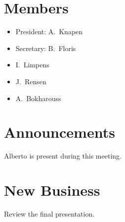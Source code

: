 \section{Members}
\begin{itemize}
	\item President: A.~Knapen
    \item Secretary: B.~Floris
    \item I.~Limpens
	\item J.~Rensen
    \item A.~Bokharouss
\end{itemize}

\section{Announcements}
\begin{items}
	\item Alberto is present during this meeting.
\end{items}


\section{New Business}
\begin{items}
    \item Review the final presentation.
\end{items}

\vspace{1em}
